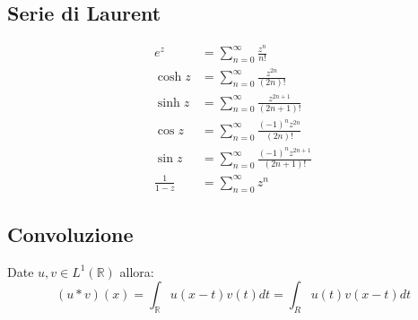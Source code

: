 \documentclass[a4paper,notitlepage]{report}%
\newcommand{\R}{\mathbb{R}}%
\begin{document}
\subsection*{Serie di Laurent}
\begin{align*}
    e^z &= \sum^\infty_{n=0} \frac{z^n}{n!}\\
    \cosh{z} &= \sum^\infty_{n=0} \frac{z^{2n}}{(2n)!}\\
    \sinh{z} &= \sum^\infty_{n=0} \frac{z^{2n+1}}{(2n+1)!}\\
    \cos{z} &= \sum^\infty_{n=0} \frac{(-1)^n z^{2n}}{(2n)!} \\
    \sin{z} &= \sum^\infty_{n=0} \frac{(-1)^n z^{2n+1}}{(2n+1)!}\\
    \frac{1}{1-z} &= \sum^\infty_{n=0} z^n
\end{align*}

\subsection*{Convoluzione}
Date $u,v\in L^1(\R)$ allora:
\[
    (u*v)(x)=\int_\R u(x-t)v(t)dt = \int_R u(t)v(x-t)dt 
\]
\end{document}
